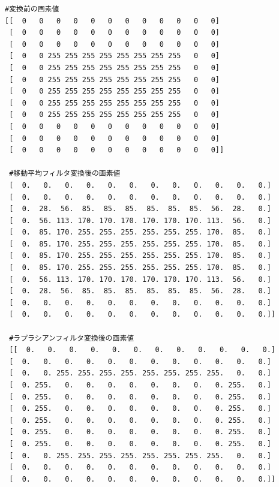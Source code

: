\documentclass[a4paper,11pt,uplatex, titlepage]{jsarticle}
\begin{document}
\begin{lstlisting}[basicstyle=\ttfamily\footnotesize]
#変換前の画素値
[[  0   0   0   0   0   0   0   0   0   0   0   0]
 [  0   0   0   0   0   0   0   0   0   0   0   0]
 [  0   0   0   0   0   0   0   0   0   0   0   0]
 [  0   0 255 255 255 255 255 255 255 255   0   0]
 [  0   0 255 255 255 255 255 255 255 255   0   0]
 [  0   0 255 255 255 255 255 255 255 255   0   0]
 [  0   0 255 255 255 255 255 255 255 255   0   0]
 [  0   0 255 255 255 255 255 255 255 255   0   0]
 [  0   0 255 255 255 255 255 255 255 255   0   0]
 [  0   0   0   0   0   0   0   0   0   0   0   0]
 [  0   0   0   0   0   0   0   0   0   0   0   0]
 [  0   0   0   0   0   0   0   0   0   0   0   0]]

 #移動平均フィルタ変換後の画素値
 [  0.   0.   0.   0.   0.   0.   0.   0.   0.   0.   0.   0.]
 [  0.   0.   0.   0.   0.   0.   0.   0.   0.   0.   0.   0.]
 [  0.  28.  56.  85.  85.  85.  85.  85.  85.  56.  28.   0.]
 [  0.  56. 113. 170. 170. 170. 170. 170. 170. 113.  56.   0.]
 [  0.  85. 170. 255. 255. 255. 255. 255. 255. 170.  85.   0.]
 [  0.  85. 170. 255. 255. 255. 255. 255. 255. 170.  85.   0.]
 [  0.  85. 170. 255. 255. 255. 255. 255. 255. 170.  85.   0.]
 [  0.  85. 170. 255. 255. 255. 255. 255. 255. 170.  85.   0.]
 [  0.  56. 113. 170. 170. 170. 170. 170. 170. 113.  56.   0.]
 [  0.  28.  56.  85.  85.  85.  85.  85.  85.  56.  28.   0.]
 [  0.   0.   0.   0.   0.   0.   0.   0.   0.   0.   0.   0.]
 [  0.   0.   0.   0.   0.   0.   0.   0.   0.   0.   0.   0.]]

 #ラプラシアンフィルタ変換後の画素値
 [[  0.   0.   0.   0.   0.   0.   0.   0.   0.   0.   0.   0.]
 [  0.   0.   0.   0.   0.   0.   0.   0.   0.   0.   0.   0.]
 [  0.   0. 255. 255. 255. 255. 255. 255. 255. 255.   0.   0.]
 [  0. 255.   0.   0.   0.   0.   0.   0.   0.   0. 255.   0.]
 [  0. 255.   0.   0.   0.   0.   0.   0.   0.   0. 255.   0.]
 [  0. 255.   0.   0.   0.   0.   0.   0.   0.   0. 255.   0.]
 [  0. 255.   0.   0.   0.   0.   0.   0.   0.   0. 255.   0.]
 [  0. 255.   0.   0.   0.   0.   0.   0.   0.   0. 255.   0.]
 [  0. 255.   0.   0.   0.   0.   0.   0.   0.   0. 255.   0.]
 [  0.   0. 255. 255. 255. 255. 255. 255. 255. 255.   0.   0.]
 [  0.   0.   0.   0.   0.   0.   0.   0.   0.   0.   0.   0.]
 [  0.   0.   0.   0.   0.   0.   0.   0.   0.   0.   0.   0.]]
\end{lstlisting}
\end{document}
